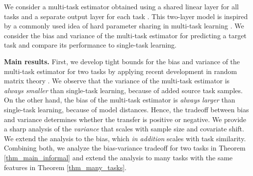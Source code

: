 We consider a multi-task estimator obtained using a shared linear layer for all tasks and a separate output layer for each task \cite{WZR20}.
This two-layer model is inspired by a commonly used idea of hard parameter sharing in multi-task learning \cite{R17,MTDNN19}.
We consider the bias and variance of the multi-task estimator for predicting a target task and compare its performance to single-task learning.

\textbf{Main results.} First, we develop tight bounds for the bias and variance of the multi-task estimator for two tasks by applying recent development in random matrix theory \cite{erdos2017dynamical,isotropic,Anisotropic}.
We observe that the variance of the multi-task estimator is \textit{always smaller} than single-task learning, because of added source task samples.
On the other hand, the bias of the multi-task estimator is \textit{always larger} than single-task learning, because of model distances.
Hence, the tradeoff between bias and variance determines whether the transfer is positive or negative.
We provide a sharp analysis of the \textit{variance} that scales with sample size and covariate shift.
We extend the analysis to the bias, which \textit{in addition} scales with {task similarity}.
Combining both, we analyze the bias-variance tradeoff for two tasks in Theorem \ref{thm_main_informal} and extend the analysis to many tasks with the same features in Theorem \ref{thm_many_tasks}.

